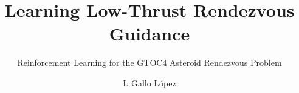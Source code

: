 \documentclass{tudelft-report}
\begin{document}
\frontmatter

\title{Learning Low-Thrust Rendezvous Guidance}
\subtitle{Reinforcement Learning for the GTOC4 Asteroid Rendezvous Problem}
\author{I. Gallo López}

\subject{AE4350: Bio-inspired Intelligence and learning for Aerospace Applications} %

\makecover


% 
% 

\tableofcontents




\mainmatter






\setcounter{biburlnumpenalty}{7000}
\setcounter{biburllcpenalty}{7000}
\setcounter{biburlucpenalty}{7000}

\printbibliography[heading=bibintoc,title=References]


\appendix

% 
% 
\end{document}
